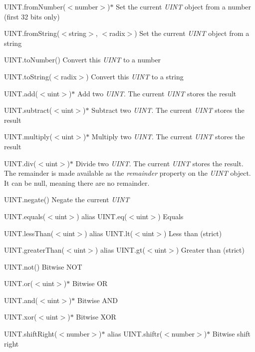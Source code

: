 \begin{DoxyItemize}
\item {\ttfamily U\+I\+N\+T.\+from\+Number($<$number$>$)$\ast$} Set the current {\itshape U\+I\+NT} object from a number (first 32 bits only)
\item {\ttfamily U\+I\+N\+T.\+from\+String($<$string$>$, $<$radix$>$)} Set the current {\itshape U\+I\+NT} object from a string
\item {\ttfamily U\+I\+N\+T.\+to\+Number()} Convert this {\itshape U\+I\+NT} to a number
\item {\ttfamily U\+I\+N\+T.\+to\+String($<$radix$>$)} Convert this {\itshape U\+I\+NT} to a string
\item {\ttfamily U\+I\+N\+T.\+add($<$uint$>$)$\ast$} Add two {\itshape U\+I\+NT}. The current {\itshape U\+I\+NT} stores the result
\item {\ttfamily U\+I\+N\+T.\+subtract($<$uint$>$)$\ast$} Subtract two {\itshape U\+I\+NT}. The current {\itshape U\+I\+NT} stores the result
\item {\ttfamily U\+I\+N\+T.\+multiply($<$uint$>$)$\ast$} Multiply two {\itshape U\+I\+NT}. The current {\itshape U\+I\+NT} stores the result
\item {\ttfamily U\+I\+N\+T.\+div($<$uint$>$)$\ast$} Divide two {\itshape U\+I\+NT}. The current {\itshape U\+I\+NT} stores the result. The remainder is made available as the {\itshape remainder} property on the {\itshape U\+I\+NT} object. It can be null, meaning there are no remainder.
\item {\ttfamily U\+I\+N\+T.\+negate()} Negate the current {\itshape U\+I\+NT}
\item {\ttfamily U\+I\+N\+T.\+equals($<$uint$>$)} alias {\ttfamily U\+I\+N\+T.\+eq($<$uint$>$)} Equals
\item {\ttfamily U\+I\+N\+T.\+less\+Than($<$uint$>$)} alias {\ttfamily U\+I\+N\+T.\+lt($<$uint$>$)} Less than (strict)
\item {\ttfamily U\+I\+N\+T.\+greater\+Than($<$uint$>$)} alias {\ttfamily U\+I\+N\+T.\+gt($<$uint$>$)} Greater than (strict)
\item {\ttfamily U\+I\+N\+T.\+not()} Bitwise N\+OT
\item {\ttfamily U\+I\+N\+T.\+or($<$uint$>$)$\ast$} Bitwise OR
\item {\ttfamily U\+I\+N\+T.\+and($<$uint$>$)$\ast$} Bitwise A\+ND
\item {\ttfamily U\+I\+N\+T.\+xor($<$uint$>$)$\ast$} Bitwise X\+OR
\item {\ttfamily U\+I\+N\+T.\+shift\+Right($<$number$>$)$\ast$} alias {\ttfamily U\+I\+N\+T.\+shiftr($<$number$>$)$\ast$} Bitwise shift right

\end{DoxyItemize}
